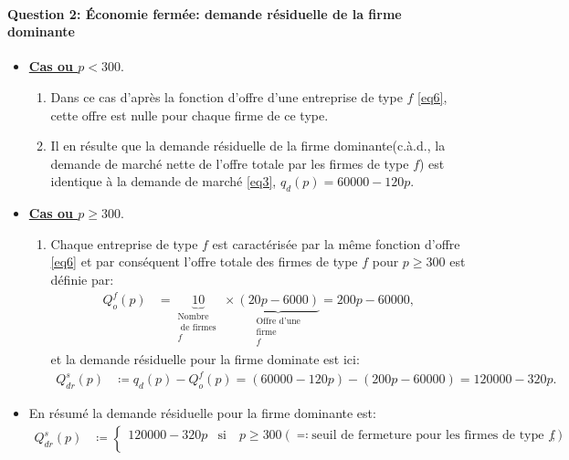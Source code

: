 \documentclass[notes, ignorenonframetext, compress, 9pt, xcolor=svgnames, aspectratio=169]{beamer}
\begin{document}
\begin{frame}
  [allowframebreaks]{\insertsection}
   \framesubtitle{Question 2: Économie fermée: demande résiduelle de la firme dominante}
   \begin{itemize}
   \item \textbf{\underline{Cas ou $p< 300$}}.
   \begin{enumerate}[$\cdot$]
   \item Dans ce cas d'après la fonction d'offre d'une entreprise de type $f$ \eqref{eq6}, cette offre est nulle pour chaque firme de ce type.
   \item Il en résulte que la demande résiduelle de la firme dominante(c.à.d., la demande de marché nette de l'offre totale par les firmes de type $f$) est identique à la demande de marché \eqref{eq3}, $q_d(p) = 60000 - 120p$.
   \end{enumerate}
    \item \textbf{\underline{Cas ou $p\geq 300$}}.
    \begin{enumerate}[$\cdot$]
   \item Chaque entreprise de type $f$ est caractérisée par la même fonction d'offre \eqref{eq6} et par conséquent l'offre totale des firmes de type $f$ 
   pour $p\geq 300$ est définie par:
   \begin{align}
   Q^f_o(p) &= \underbrace{10}_{\substack{\text{Nombre}\\ \text{ de firmes }\\ f}} \times \underbrace{(20p-6000 )}_{\substack{\text{Offre d'une}\\ 
   \text{firme }\\f}} = 200p - 60000,
   \end{align}
   et la demande résiduelle pour la firme dominate est ici:
     \begin{align*}
Q_{dr}^s(p) &\coloneqq q_d(p) - Q^f_o(p) =  (60000 - 120p) -  (200p - 60000) = 120000-320p.
\end{align*}
    \end{enumerate}
    \item En résumé la demande résiduelle pour la firme dominante est:
    \begin{align}
Q_{dr}^s(p)&\coloneqq \left\{
\begin{array}{ll}
120000-320p& \text{si} \quad p\geq 300 (\eqqcolon \text{seuil de fermeture pour les firmes de type $f$}), \\

\end{array}
\end{align}
\end{itemize}
\end{frame}
\end{document}
